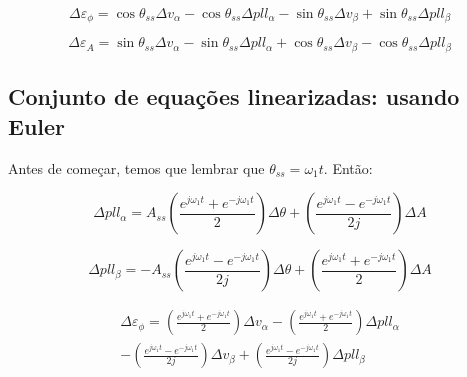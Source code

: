 \documentclass[12pt,a4paper]{report}
\begin{document}
\begin{equation}
\Delta \varepsilon_\phi = 
\cos \theta_{ss} \Delta v_{\alpha} 
- \cos \theta_{ss}  \Delta pll_\alpha 
- \sin \theta_{ss} \Delta v_\beta 
+ \sin \theta_{ss}  \Delta pll_\beta
\end{equation}


\begin{equation}
\Delta\varepsilon_A =
\sin \theta_{ss}  \Delta v_\alpha 
- \sin \theta_{ss} \Delta pll_\alpha 
+ \cos \theta_{ss} \Delta v_\beta 
- \cos \theta_{ss} \Delta pll_\beta
\end{equation}




\subsection{Conjunto de equações linearizadas: usando Euler}


Antes de começar, temos que lembrar que $\theta_{ss} = \omega_{1}t$. Então:




\begin{equation}
\Delta pll_{\alpha} = 
A_{ss} 
\left(
\frac{e^{j\omega_1 t} + e^{-j\omega_1 t}}{2}
\right)
\Delta \theta +
\left(
\frac{e^{j\omega_1 t} - e^{-j\omega_1 t}}{2j}
\right)
\Delta A
\label{eq:pll:alpha:Lin:3}
\end{equation}



\begin{equation}
\Delta pll_{\beta} = 
- A_{ss} 
\left(
\frac{e^{j\omega_1 t} - e^{-j\omega_1 t}}{2j}
\right) 
\Delta \theta +
\left(
\frac{e^{j\omega_1 t} + e^{-j\omega_1 t}}{2}
\right)
\Delta A
\label{eq:pll:beta:Lin:3}
\end{equation}



\begin{multline}
\Delta \varepsilon_\phi = 
\left(
\frac{e^{j\omega_1 t} + e^{-j\omega_1 t}}{2}
\right)
\Delta v_{\alpha} 
- \left(
\frac{e^{j\omega_1 t} + e^{-j\omega_1 t}}{2}
\right)
\Delta pll_\alpha \\
- \left(
\frac{e^{j\omega_1 t} - e^{-j\omega_1 t}}{2j}
\right) 
\Delta v_\beta 
+ \left(
\frac{e^{j\omega_1 t} - e^{-j\omega_1 t}}{2j}
\right) 
\Delta pll_\beta
\label{eq:erro:phi:Lin:3}
\end{multline}
\end{document}

